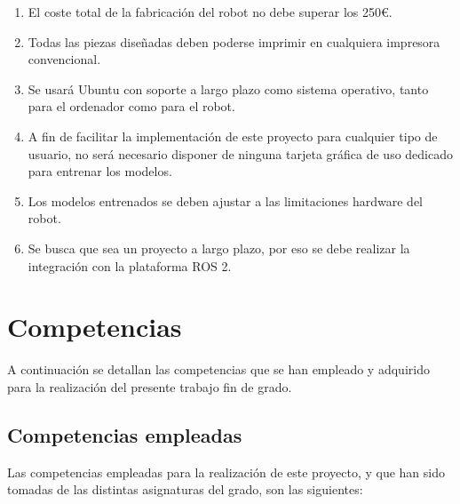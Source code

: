 \begin{enumerate}
	\item{} El coste total de la fabricación del robot no debe superar los 250€.
	\item{} Todas las piezas diseñadas deben poderse imprimir en cualquiera impresora convencional.
	\item{} Se usará Ubuntu con soporte a largo plazo como sistema operativo, tanto para el ordenador como para el robot.
	\item{} A fin de facilitar la implementación de este proyecto para cualquier tipo de usuario, no será necesario disponer de ninguna tarjeta gráfica de uso dedicado para entrenar los modelos. 
	\item{} Los modelos entrenados se deben ajustar a las limitaciones hardware del robot.
	\item{} Se busca que sea un proyecto a largo plazo, por eso se debe realizar la integración con la plataforma ROS 2. 
	
	
\end{enumerate}

\section{Competencias}
\label{sec:competencias}

A continuación se detallan las competencias que se han empleado y adquirido para la realización del presente trabajo fin de grado.
   
\subsection{Competencias empleadas}
\label{subsec:competenciase}
Las competencias empleadas para la realización de este proyecto, y que han sido tomadas de las distintas asignaturas del grado, son las siguientes: 

